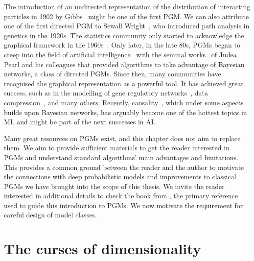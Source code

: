 The introduction of an undirected representation of the distribution of interacting particles in 1902 by Gibbs~\citep{gibbs1902elementary} might be one of the first PGM. We can also attribute one of the first directed PGM to Sewall Wright~\citep{wright1921systems, wright1934method}, who introduced path analysis in genetics in the 1920s. The statistics community only started to acknowledge the graphical framework in the 1960s~\citep{li1968fisher, wright1960path}. Only later, in the late 80s, PGMs began to creep into the field of artificial intelligence~\citep[][AI]{russell2010artificial} with the seminal works~\citep{pearl2022reverend, kim1983computational, pearl1985bayesian} of Judea Pearl and his colleagues that provided algorithms to take advantage of Bayesian networks, a class of directed PGMs. Since then, many communities have recognised the graphical representation as a powerful tool. It has achieved great success, such as in the modelling of gene regulatory networks~\citep{werhli2007reconstructing}, data compression~\citep{mceliece1998turbo}, and many others. Recently, causality~\citep{pearl2009causality, peters2017elements}, which under some aspects builds upon Bayesian networks, has arguably become one of the hottest topics in ML and might be part of the next successes in AI.

Many great resources on PGMs exist, and this chapter does not aim to replace them. We aim to provide sufficient materials to get the reader interested in PGMs and understand standard algorithms' main advantages and limitations. This provides a common ground between the reader and the author to motivate the connections with deep probabilistic models and improvements to classical PGMs we have brought into the scope of this thesis. We invite the reader interested in additional details to check the book from \citet{koller_probabilistic_2009}, the primary reference used to guide this introduction to PGMs. We now motivate the requirement for careful design of model classes.

\section{The curses of dimensionality}
